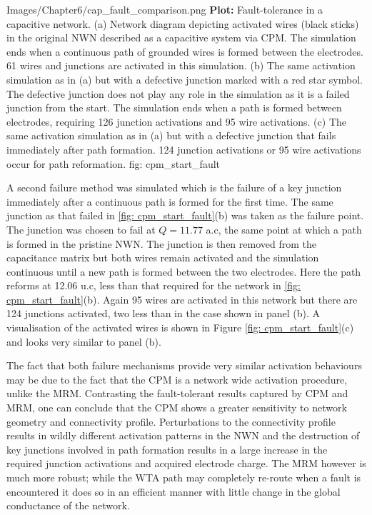 {Images/Chapter6/cap_fault_comparison.png}
{\textbf{Plot:} Fault-tolerance in a capacitive network.}
{ (a) Network diagram depicting activated wires (black sticks) in the original NWN described as a capacitive system via CPM. The simulation ends when a continuous path of grounded wires is formed between the electrodes. 61 wires and junctions are activated in this simulation. (b) The same activation simulation as in (a) but with a defective junction marked with a red star symbol. The defective junction does not play any role in the simulation as it is a failed junction from the start. The simulation ends when a path is formed between electrodes, requiring 126 junction activations and 95 wire activations. (c) The same activation simulation as in (a) but with a defective junction that fails immediately after path formation. 124 junction activations or 95 wire activations occur for path reformation\cite{ocallaco2018}.}
{fig: cpm_start_fault}

A second failure method was simulated which is the failure of a key junction immediately after a continuous path is formed for the first time. The same junction as that failed in \ref{fig: cpm_start_fault}(b) was taken as the failure point. The junction was chosen to fail at $Q = 11.77$ a.c, the same point at which a path is formed in the pristine NWN. The junction is then removed from the capacitance matrix but both wires remain activated and the simulation continuous until a new path is formed between the two electrodes. Here the path reforms at 12.06 u.c, less than that required for the network in \ref{fig: cpm_start_fault}(b). Again 95 wires are activated in this network but there are 124 junctions activated, two less than in the case shown in panel (b). A visualisation of the activated wires is shown in Figure \ref{fig: cpm_start_fault}(c) and looks very similar to panel (b).

The fact that both failure mechanisms provide very similar activation behaviours may be due to the fact that the CPM is a network wide activation procedure, unlike the MRM. Contrasting the fault-tolerant results captured by CPM and MRM, one can conclude that the CPM shows a greater sensitivity to network geometry and connectivity profile. Perturbations to the connectivity profile results in wildly different activation patterns in the NWN and the destruction of key junctions involved in path formation results in a large increase in the required junction activations and acquired electrode charge. The MRM however is much more robust; while the WTA path may completely re-route when a fault is encountered it does so in an efficient manner with little change in the global conductance of the network. 

